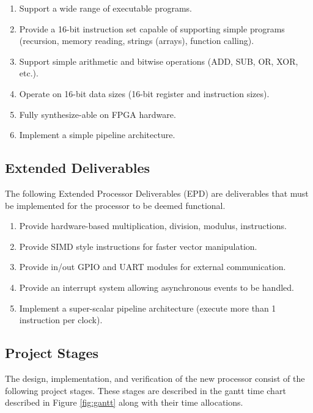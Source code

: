 \documentclass[11pt,a4paper]{report}
\begin{document}
\begin{enumerate}[label=\bfseries CPD\arabic*.]
\item{Support a wide range of executable programs.}
\item{Provide a 16-bit instruction set capable of supporting simple programs (recursion, memory reading, strings (arrays), function calling).}
\item{Support simple arithmetic and bitwise operations (ADD, SUB, OR, XOR, etc.).}
\item{Operate on 16-bit data sizes (16-bit register and instruction sizes).}
\item{Fully synthesize-able on FPGA hardware.}
\item{Implement a simple pipeline architecture.}
\end{enumerate}

\subsection{Extended Deliverables}
The following Extended Processor Deliverables (EPD) are deliverables that must be implemented for the processor to be deemed functional.
\begin{enumerate}[label=\bfseries EPD\arabic*.]
\item{Provide hardware-based multiplication, division, modulus, instructions.}
\item{Provide SIMD style instructions for faster vector manipulation.}
\item{Provide in/out GPIO and UART modules for external communication.}
\item{Provide an interrupt system allowing asynchronous events to be handled.}
\item{Implement a super-scalar pipeline architecture (execute more than 1 instruction per clock).}
\end{enumerate}

\subsection{Project Stages}
The design, implementation, and verification of the new processor consist of the following project stages. These stages are described in the gantt time chart described in Figure \ref{fig:gantt} along with their time allocations.
\end{document}
